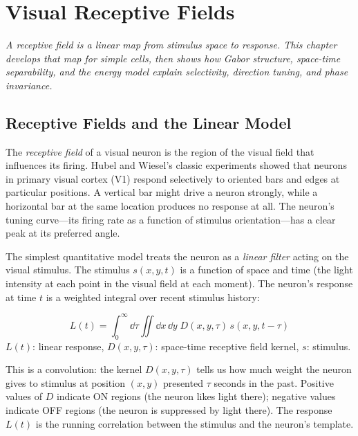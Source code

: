 \chapter{Visual Receptive Fields}
\label{ch:receptive-fields}

\textit{A receptive field is a linear map from stimulus space to response. This chapter develops that map for simple cells, then shows how Gabor structure, space-time separability, and the energy model explain selectivity, direction tuning, and phase invariance.}

\section{Receptive Fields and the Linear Model}
\label{sec:receptive-field}

The \emph{receptive field} of a visual neuron is the region of the visual field that influences its firing. Hubel and Wiesel's classic experiments showed that neurons in primary visual cortex (V1) respond selectively to oriented bars and edges at particular positions. A vertical bar might drive a neuron strongly, while a horizontal bar at the same location produces no response at all. The neuron's tuning curve---its firing rate as a function of stimulus orientation---has a clear peak at its preferred angle.

The simplest quantitative model treats the neuron as a \emph{linear filter} acting on the visual stimulus. The stimulus $s(x, y, t)$ is a function of space and time (the light intensity at each point in the visual field at each moment). The neuron's response at time $t$ is a weighted integral over recent stimulus history:

\begin{keyequation}
\begin{equation}
  L(t) = \int_0^\infty \!\dd\tau \iint \dd x\,\dd y\; D(x, y, \tau)\, s(x, y, t - \tau)
  \label{eq:linear-rf}
\end{equation}
\tcblower
$L(t)$: linear response, \quad
$D(x, y, \tau)$: space-time receptive field kernel, \quad
$s$: stimulus.
\end{keyequation}

\noindent This is a convolution: the kernel $D(x, y, \tau)$ tells us how much weight the neuron gives to stimulus at position $(x, y)$ presented $\tau$ seconds in the past. Positive values of $D$ indicate ON regions (the neuron likes light there); negative values indicate OFF regions (the neuron is suppressed by light there). The response $L(t)$ is the running correlation between the stimulus and the neuron's template.

